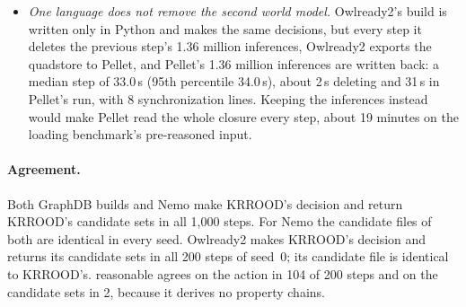 \documentclass[10pt]{article}
\begin{document}
\begin{itemize}
        lines. reasonable takes 4.6\,s per step
        (seed~0) and finds no handout candidate.
  \item \emph{One language does not remove the second world model.} Owlready2's build is written only in Python and
        makes the same decisions, but every step it deletes the previous step's 1.36 million inferences, Owlready2
        exports the quadstore to Pellet, and Pellet's 1.36 million inferences are written back: a median step of
        33.0\,s (95th percentile 34.0\,s), about 2\,s deleting and 31\,s in Pellet's run, with 8 synchronization
        lines. Keeping the inferences instead would make Pellet read the whole closure every step, about 19 minutes on
        the loading benchmark's pre-reasoned input.
\end{itemize}

\paragraph{Agreement.} Both GraphDB builds and Nemo make KRROOD's decision and return KRROOD's candidate sets in all
1,000 steps. For Nemo the candidate files of both are identical in every seed. Owlready2 makes KRROOD's decision and returns its candidate sets in all 200 steps of seed~0;
its candidate file is identical to KRROOD's. reasonable agrees on the action in 104
of 200 steps and on the candidate sets in 2, because it derives no property chains.
\end{document}
